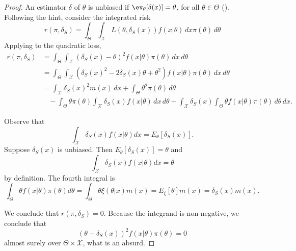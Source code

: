 \begin{proof}
    An estimator $\delta$ of $\theta$ is unbiased if $\ev_{\theta}[\delta(x)] =
    \theta$, for all $\theta \in \Theta$ (\cite{schervish1996theory}).
    Following the hint, consider the integrated risk 
    $$
    r(\pi, \delta_S) = \int_{\Theta}\int_{\mathcal{X}} L(\theta, \delta_S(x)) f(x|\theta) \,dx \pi(\theta) \, d\theta 
    $$
    Applying to the quadratic loss,
    \begin{equation*}
        \begin{split}
            r(\pi, \delta_S) &= \int_{\Theta}\int_{\mathcal{X}} (\delta_S(x) - \theta)^2 f(x|\theta)\pi(\theta) \, dx \, d\theta \\
            &= \int_{\Theta}\int_{\mathcal{X}} \left(\delta_S(x)^2 - 2\delta_S(x)\theta + \theta^2\right) f(x|\theta)\pi(\theta) \, dx \, d\theta \\ 
            &= \int_{\mathcal{X}} \delta_S(x)^2 m(x) \, dx + \int_{\Theta} \theta^2 \pi(\theta) \, d\theta \\
            &~~~~- \int_{\Theta} \theta \pi(\theta) \int_{\mathcal{X}} \delta_S(x) f(x|\theta)\, dx \, d\theta - \int_{\mathcal{X}} \delta_S(x) \int_{\Theta} \theta f(x|\theta)\pi(\theta) \, d\theta \, dx. 
        \end{split}
    \end{equation*}

    Observe that 
    $$\int_{\mathcal{X}} \delta_S(x) f(x|\theta)dx =
    E_{\theta}[\delta_S(x)].$$ Suppose $\delta_S(x)$ is unbiased. Then
    $E_{\theta}[\delta_S(x)] = \theta$ and 
    $$
    \int_{\mathcal{X}} \delta_S(x) f(x|\theta)dx = \theta
    $$
    by definition. The fourth integral is 
    $$\int_{\Theta} \theta f(x|\theta)\pi(\theta)d\theta = \int_{\Theta} \theta
    \xi(\theta|x)m(x) = E_{\xi}[\theta]m(x) = \delta_S(x)m(x).$$

    We conclude that $r(\pi, \delta_S) = 0$. Because the integrand is
    non-negative, we conclude that 
    $$
    (\theta - \delta_S(x))^2f(x|\theta)\pi(\theta) = 0
    $$
    almost surely over $\Theta \times \mathcal{X}$, what is an absurd. 

\end{proof}